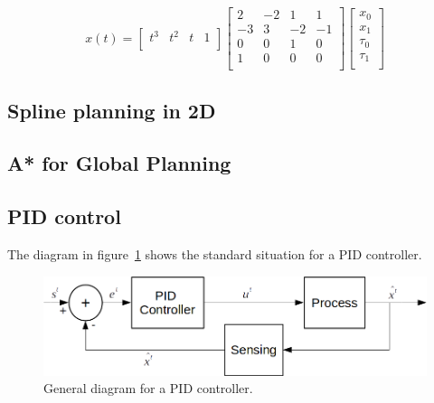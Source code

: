\begin{equation}
x(t) = \left[
 \begin{array}{cccc}
  t^3 & t^2 & t & 1 \\
 \end{array}
 \right]
 \left[
 \begin{array}{cccc}
  2 & -2 & 1 & 1 \\
  -3 & 3 & -2 & -1\\
  0 & 0 & 1 & 0 \\
  1 & 0 & 0 & 0 \\
 \end{array}
 \right]
 \left[
 \begin{array}{c}
  x_0 \\
  x_1\\
  \tau_0 \\
  \tau_1\\
 \end{array}
 \right]
\end{equation}




\subsection{Spline planning in 2D}

\subsection{A* for Global Planning}

\subsection{PID control}

The diagram in figure~\ref{fig:pid} shows the standard situation for a PID controller. 

\begin{figure}[bth!]
  \begin{center}
    \includegraphics[width=1.0\columnwidth]{figures/pid.png}
    \caption{General diagram for a PID controller.}
    \label{fig:pid}
  \end{center}
\end{figure}


